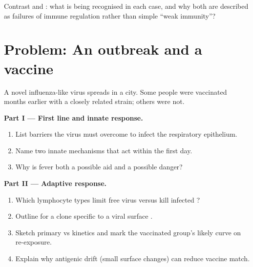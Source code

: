 \begin{exercise}[$\star\star\star$]\label{exo:g12:immunity:14}
Contrast  and : what is being recognised in each
case, and why both are described as failures of immune regulation rather
than simple ``weak immunity''?
\end{exercise}

\section{Problem: An outbreak and a vaccine}

\begin{problem}
\label{pb:g12:immunity:1}
A novel influenza-like virus spreads in a city. Some people were
vaccinated months earlier with a closely related strain; others were
not.

\medskip
\noindent\textbf{Part I --- First line and innate response.}
\begin{enumerate}
  \item List barriers the virus must overcome to infect the respiratory
        epithelium.
  \item Name two innate mechanisms that act within the first day.
  \item Why is fever both a possible aid and a possible danger?
\end{enumerate}

\medskip
\noindent\textbf{Part II --- Adaptive response.}
\begin{enumerate}[resume]
  \item Which lymphocyte types limit free virus versus kill infected
        ?
  \item Outline  for a  clone specific to a viral
        surface .
  \item Sketch primary vs   kinetics and mark the
        vaccinated group's likely curve on re-exposure.
  \item Explain why antigenic drift (small surface changes) can reduce
        vaccine match.
\end{enumerate}


\end{problem}
